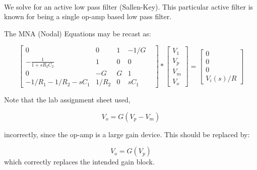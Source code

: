 \documentclass[11pt]{article}
\begin{document}
    \begin{center}
    \end{center}
    { \hspace*{\fill} \\}
    
    We solve for an active low pass filter (Sallen-Key). This particular
active filter is known for being a single op-amp based low pass filter.

The MNA (Nodal) Equations may be recast as:

\[
\begin{bmatrix}
   0& 0& 1& -1/G\\   
   −\frac{1}{1+s R_2 C_2}& 1& 0& 0&\\
   0& −G& G& 1&\\
   -1/R_1-1/R_2-sC_1& 1/R_2& 0& sC_1&
   \end{bmatrix}
   *
   \begin{bmatrix} V_1 \\ V_p \\ V_m\\ V_o \end{bmatrix}
   =
   \begin{bmatrix} 0\\ 0\\ 0\\ V_i(s)/R \end{bmatrix}
\]

Note that the lab assignment sheet used,

\[ V_o=G(V_p −V_m) \]

incorrectly, since the op-amp is a large gain device. This should be
replaced by:

\[ V_o=G(V_p) \] which correctly replaces the intended gain block.
\end{document}
